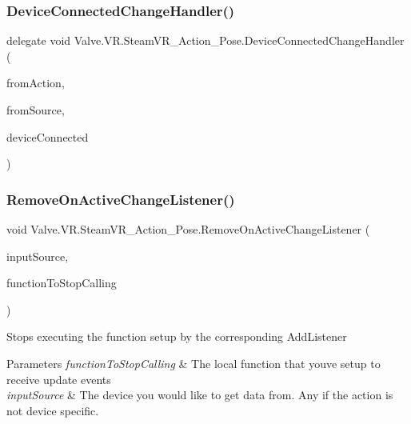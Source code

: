 \subsubsection{\texorpdfstring{DeviceConnectedChangeHandler()}{DeviceConnectedChangeHandler()}}
{\footnotesize\ttfamily delegate void Valve.\+V\+R.\+Steam\+V\+R\+\_\+\+Action\+\_\+\+Pose.\+Device\+Connected\+Change\+Handler (\begin{DoxyParamCaption}\item[{\mbox{\hyperlink{class_valve_1_1_v_r_1_1_steam_v_r___action___pose}{Steam\+V\+R\+\_\+\+Action\+\_\+\+Pose}}}]{from\+Action,  }\item[{\mbox{\hyperlink{namespace_valve_1_1_v_r_a82e5bf501cc3aa155444ee3f0662853f}{Steam\+V\+R\+\_\+\+Input\+\_\+\+Sources}}}]{from\+Source,  }\item[{bool}]{device\+Connected }\end{DoxyParamCaption})}

\mbox{\label{class_valve_1_1_v_r_1_1_steam_v_r___action___pose_a664b0d917e3abab308a6df857d707d0b}} 
\subsubsection{\texorpdfstring{RemoveOnActiveChangeListener()}{RemoveOnActiveChangeListener()}}
{\footnotesize\ttfamily void Valve.\+V\+R.\+Steam\+V\+R\+\_\+\+Action\+\_\+\+Pose.\+Remove\+On\+Active\+Change\+Listener (\begin{DoxyParamCaption}\item[{\mbox{\hyperlink{namespace_valve_1_1_v_r_a82e5bf501cc3aa155444ee3f0662853f}{Steam\+V\+R\+\_\+\+Input\+\_\+\+Sources}}}]{input\+Source,  }\item[{\mbox{\hyperlink{class_valve_1_1_v_r_1_1_steam_v_r___action___pose_a3861a4b4b8ce246db2cc77e632a7f999}{Active\+Change\+Handler}}}]{function\+To\+Stop\+Calling }\end{DoxyParamCaption})}



Stops executing the function setup by the corresponding Add\+Listener 


\begin{DoxyParams}{Parameters}
{\em function\+To\+Stop\+Calling} & The local function that you\textquotesingle{}ve setup to receive update events\\
\hline
{\em input\+Source} & The device you would like to get data from. Any if the action is not device specific.\\
\hline
\end{DoxyParams}


